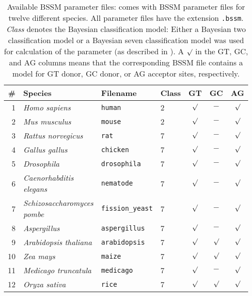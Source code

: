 \begin{table} 
\begin{center}                 
\begin{tabular}{|r|l|l|l|c|c|c|}
\hline
\# & Species & Filename & Class & GT & GC & AG\\
\hline
\hline
 1 & \textit{Homo sapiens}              & \texttt{human}          & 2 
   & $\surd$ & $-$ & $\surd$ \\
\hline

 2 & \textit{Mus musculus}              & \texttt{mouse}          & 2 
   & $\surd$ & $-$ & $\surd$ \\
\hline

 3 & \textit{Rattus norvegicus}         & \texttt{rat}            & 7 
   & $\surd$ & $-$ & $\surd$ \\
\hline

 4 & \textit{Gallus gallus}             & \texttt{chicken}        & 7 
   & $\surd$ & $-$ & $\surd$ \\
\hline

 5 & \textit{Drosophila}                & \texttt{drosophila}     & 7 
   & $\surd$ & $-$ & $\surd$ \\
\hline

 6 & \textit{Caenorhabditis elegans}    & \texttt{nematode}       & 7 
   & $\surd$ & $-$ & $\surd$ \\
\hline

 7 & \textit{Schizosaccharomyces pombe} & \texttt{fission\_yeast} & 7
   & $\surd$ & $-$ & $\surd$ \\
\hline

 8 & \textit{Aspergillus}               & \texttt{aspergillus}    & 7
   & $\surd$ & $-$ & $\surd$ \\
\hline

 9 & \textit{Arabidopsis thaliana}      & \texttt{arabidopsis}    & 7
   & $\surd$ & $\surd$ & $\surd$ \\
\hline

10 & \textit{Zea mays}                  & \texttt{maize}          & 7 
   & $\surd$ & $\surd$ & $\surd$ \\
\hline

11 & \textit{Medicago truncatula}       & \texttt{medicago}       & 7
   & $\surd$ & $-$ & $\surd$ \\
\hline

12 & \textit{Oryza sativa}              & \texttt{rice}           & 7
   & $\surd$ & $\surd$ & $\surd$ \\
\hline

\end{tabular}
\caption[Available BSSM parameter files]{Available BSSM parameter files: \Gth
comes with BSSM parameter files for twelve different species. All parameter files have the extension
\texttt{.bssm}. \textit{Class} denotes the Bayesian classification model:
Either a Bayesian two classification model or a Bayesian seven
classification model was used for calculation of the parameter (as described in \cite{BRE:XIN:ZHU:2004}). A $\surd$ in the GT, GC, and AG columns means that the corresponding BSSM file contains a model for GT donor, GC donor, or AG acceptor sites, respectively.}
\label{speciestable}
\end{center}
\end{table}
